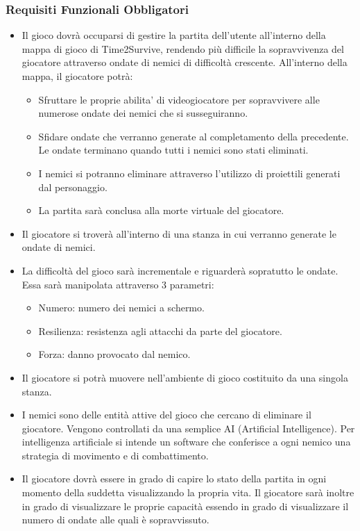 \documentclass[a4paper,12pt]{report}
\begin{document}
\subsubsection{Requisiti Funzionali Obbligatori}
\begin{itemize}
	\item Il gioco dovrà occuparsi di gestire la partita dell’utente all’interno della mappa di gioco di Time2Survive, rendendo più difficile la sopravvivenza del giocatore attraverso ondate di nemici di difficoltà crescente.
    All’interno della mappa, il giocatore potrà:
    \begin{itemize}
        \item Sfruttare le proprie abilita’ di videogiocatore per sopravvivere alle numerose ondate dei nemici che si susseguiranno.
        \item Sfidare ondate che verranno generate al completamento della precedente. Le ondate terminano quando tutti i nemici sono stati eliminati.
        \item I nemici si potranno eliminare attraverso l'utilizzo di proiettili generati dal personaggio.
        \item La partita sarà conclusa alla morte virtuale del giocatore.
    \end{itemize}
	\item Il giocatore si troverà all'interno di una stanza in cui verranno generate le ondate di nemici.
	\item La difficoltà del gioco sarà incrementale e riguarderà sopratutto le ondate. Essa sarà manipolata attraverso 3 parametri:
    \begin{itemize}
        \item Numero: numero dei nemici a schermo.
        \item Resilienza: resistenza agli attacchi da parte del giocatore.
        \item Forza: danno provocato dal nemico.
    \end{itemize}
	\item Il giocatore si potrà muovere nell’ambiente di gioco costituito da una singola stanza.
    \item I nemici sono delle entità attive del gioco che cercano di eliminare il giocatore.
    Vengono controllati da una semplice AI (Artificial Intelligence). 
	Per intelligenza artificiale si intende un software che conferisce a ogni nemico una strategia di movimento e di combattimento.
    \item Il giocatore dovrà essere in grado di capire lo stato della partita in ogni momento della suddetta visualizzando la propria vita. 
	Il giocatore sarà inoltre in grado di visualizzare le proprie capacità essendo in grado di visualizzare il numero di ondate alle quali è sopravvissuto.
\end{itemize}
\end{document}

